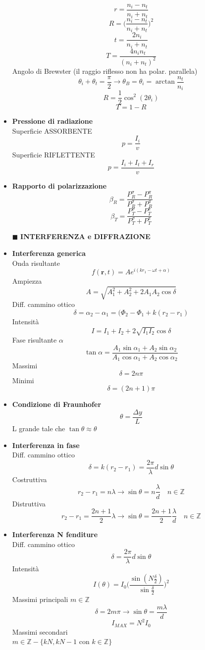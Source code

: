 \documentclass{book}
\newcommand{\g}{\textbf}
\newcommand{\h}{\mathbf}
\newcommand{\e}{\begin{equation}}
\newcommand{\ex}{\end{equation} }
\renewcommand{\it}{\item[$\cdot$]}
\begin{document}
\begin{multicols}{4}
\begin{itemize}
    \e{r=\frac{n_i-n_t}{n_i+n_t}} \ex
    \e{R=\biggl(\frac{n_i-n_t}{n_i+n_t}\biggr)^2} \ex
    \e{t=\frac{2n_i}{n_i+n_t}} \ex
    \e{T=\frac{4n_in_t}{(n_i+n_t)^2}} \ex
    Angolo di Brewster (il raggio riflesso non ha polar. parallela)
    \e{\theta_i+\theta_t=\frac{\pi}{2} \rightarrow \theta_B=\theta_i=\arctan\frac{n_t}{n_i}} \ex
    \e{R=\frac{1}{2}\cos^2(2\theta_i)} \ex
    \e{T=1-R} \ex
    \it \g{Pressione di radiazione} \\
    Superficie ASSORBENTE
    \e{p=\frac{I_i}{v}} \ex
    Superficie RIFLETTENTE
    \e{p=\frac{I_i+I_t+I_r}{v}} \ex
    \it \g{Rapporto di polarizzazione}
    \e{\beta_R=\frac{P_R^\sigma-P_R^\pi}{P_R^\sigma+P_R^\pi}} \ex
    \e{\beta_T=\frac{P_T^\sigma-P_T^\pi}{P_T^\sigma+P_T^\pi}} \ex
    
\item [$\blacksquare$] \g{INTERFERENZA e DIFFRAZIONE}  \\  
    \it \g{Interferenza generica} \\
    Onda risultante
    \e{f(\h{r},t)=Ae^{i(kr_1-\omega t+\alpha)}} \ex
    Ampiezza
    \e{A=\sqrt{A_1^2+A_2^2+2A_1A_2\cos\delta}} \ex
    Diff. cammino ottico
    \e{\delta=\alpha_2-\alpha_1=(\Phi_2-\Phi_1+k(r_2-r_1)} \ex
    Intensità
    \e{I=I_1+I_2+2\sqrt{I_1I_2}\cos{\delta}} \ex
    Fase risultante $\alpha$
    \e{\tan\alpha=\frac{A_1\sin{\alpha_1}+A_2\sin{\alpha_2}}{A_1\cos{\alpha_1}+A_2\cos{\alpha_2}}} \ex
    Massimi
    \e{\delta=2n\pi} \ex
    Minimi
    \e{\delta=(2n+1)\pi } \ex
    \it \g{Condizione di Fraunhofer} \\
    \e{\theta=\frac{\Delta y}{L}} \ex
    L grande tale che $\tan\theta\approx\theta$     
    \it \g{Interferenza in fase} \\
    Diff. cammino ottico
    \e{\delta=k(r_2-r_1)=\frac{2\pi}{\lambda}d\sin{\theta}} \ex
    Costruttiva
    \e{r_2-r_1=n\lambda \rightarrow \sin{\theta}=n\frac{\lambda}{d} \quad n\in\mathbb{Z}} \ex
    Distruttiva
    \e{r_2-r_1=\frac{2n+1}{2}\lambda \rightarrow \sin{\theta}=\frac{2n+1}{2}\frac{\lambda}{d} \quad n\in\mathbb{Z}} \ex
    \it \g{Interferenza N fenditure} \\
    Diff. cammino ottico
    \e{\delta=\frac{2\pi}{\lambda}d\sin{\theta}} \ex
    Intensità
    \e{I(\theta)=I_0\biggl(\frac{\sin(N\frac{\delta}{2})}{\sin\frac{\delta}{2}}\biggr)^2} \ex
    Massimi principali $m\in\mathbb{Z}$
    \e{\delta=2m\pi \rightarrow \sin\theta=\frac{m\lambda}{d}} \ex
    \e{I_{MAX}=N^2I_0} \ex
    Massimi secondari \\
    $m\in\mathbb{Z}-\{kN,kN-1$ con $k\in\mathbb{Z}\}$

\end{itemize}
\end{multicols}
\end{document}
